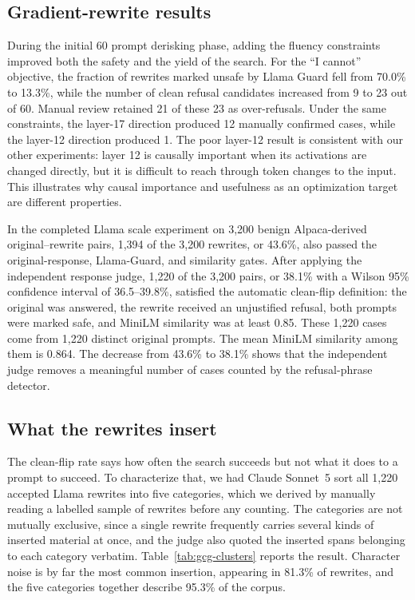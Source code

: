 \documentclass{article}
\begin{document}
\subsection{Gradient-rewrite results}


During the initial 60 prompt derisking phase, adding the fluency constraints improved both the safety and the yield of the search. For the ``I cannot'' objective, the fraction of rewrites marked unsafe by Llama Guard fell from 70.0\% to 13.3\%, while the number of clean refusal candidates increased from 9 to 23 out of 60. Manual review retained 21 of these 23 as over-refusals. Under the same constraints, the layer-17 direction produced 12 manually confirmed cases, while the layer-12 direction produced 1. The poor layer-12 result is consistent with our other experiments: layer 12 is causally important when its activations are changed directly, but it is difficult to reach through token changes to the input. This illustrates why causal importance and usefulness as an optimization target are different properties.

In the completed Llama scale experiment on 3{,}200 benign Alpaca-derived original--rewrite pairs, 1,394 of the 3,200 rewrites, or 43.6\%, also passed the original-response, Llama-Guard, and similarity gates. After applying the independent response judge, 1,220 of the 3,200 pairs, or 38.1\% with a Wilson 95\% confidence interval of 36.5--39.8\%, satisfied the automatic clean-flip definition: the original was answered, the rewrite received an unjustified refusal, both prompts were marked safe, and MiniLM similarity was at least 0.85. These 1,220 cases come from 1,220 distinct original prompts. The mean MiniLM similarity among them is 0.864. The decrease from 43.6\% to 38.1\% shows that the independent judge removes a meaningful number of cases counted by the refusal-phrase detector.






\subsection{What the rewrites insert}

The clean-flip rate says how often the search succeeds but not what it does to a prompt to
succeed. To characterize that, we had Claude Sonnet~5 sort all 1{,}220 accepted Llama
rewrites into five categories, which we derived by manually reading a labelled sample of
rewrites before any counting. The categories are not mutually exclusive, since a single
rewrite frequently carries several kinds of inserted material at once, and the judge also
quoted the inserted spans belonging to each category verbatim. Table~\ref{tab:gcg-clusters}
reports the result. Character noise is by far the most common insertion, appearing in
81.3\% of rewrites, and the five categories together describe 95.3\% of the corpus.
\end{document}
